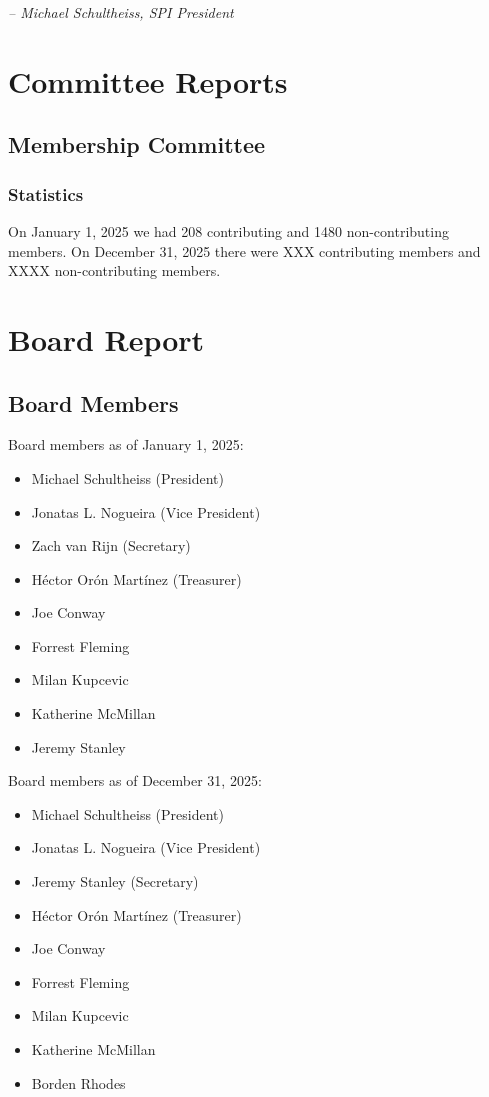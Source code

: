 \documentclass[a4paper]{report}
\begin{document}
  \emph{-- Michael Schultheiss, SPI President}

\newpage

\tableofcontents

\newpage

\chapter{Committee Reports}
\section{Membership Committee}

\subsection{Statistics}

On January 1, 2025 we had 208 contributing and 1480 non-contributing members.  On December 31, 2025 there were XXX contributing members and XXXX non-contributing members.

\chapter{Board Report}
\section{Board Members}

Board members as of January 1, 2025:

\begin{itemize}
\item Michael Schultheiss (President)
\item Jonatas L. Nogueira (Vice President)
\item Zach van Rijn (Secretary)
\item Héctor Orón Martínez (Treasurer)
\item Joe Conway
\item Forrest Fleming
\item Milan Kupcevic
\item Katherine McMillan
\item Jeremy Stanley
\end{itemize}

Board members as of December 31, 2025:

\begin{itemize}
\item Michael Schultheiss (President)
\item Jonatas L. Nogueira (Vice President)
\item Jeremy Stanley (Secretary)
\item Héctor Orón Martínez (Treasurer)
\item Joe Conway
\item Forrest Fleming
\item Milan Kupcevic
\item Katherine McMillan
\item Borden Rhodes
\end{itemize}
\end{document}

